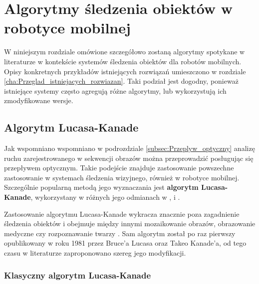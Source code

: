 \chapter{Algorytmy śledzenia obiektów w robotyce mobilnej}
\label{cha:Algorymty_sledzenia_obiektow_w_robotyce_mobilnej}

W niniejszym rozdziale omówione szczegółowo zostaną algorytmy spotykane w literaturze w kontekście systemów śledzenia obiektów dla robotów mobilnych. Opisy konkretnych przykładów istniejących rozwiązań umieszczono w rozdziale \ref{cha:Przeglad_istniejacych_rozwiazan}. Taki podział jest dogodny, ponieważ  istniejące systemy często agregują różne algorytmy, lub wykorzystują ich zmodyfikowane wersje.

\section{Algorytm Lucasa-Kanade}
\label{sec:Algorytm_Lucasa_Kanade}
Jak wspomniano wspomniano w podrozdziale \ref{subsec:Przeplyw_optyczny} analizę ruchu zarejestrowanego w sekwencji obrazów można przeprowadzić posługując się przepływem optycznym. Takie podejście znajduje zastosowanie powszechne zastosowanie w systemach śledzenia wizyjnego, również w robotyce mobilnej. Szczególnie popularną metodą jego wyznaczania jest \textbf{algorytm Lucasa-Kanade}, wykorzystany w różnych jego odmianach w \cite{Liem2008}, \cite{Markovic2014} i \cite{Olivares-Mendez2009}.

Zastosowanie algorytmu Lucasa-Kanade wykracza znacznie poza zagadnienie śledzenia obiektów i obejmuje między innymi mozaikowanie obrazów, obrazowanie medyczne czy rozpoznawanie twarzy \cite{Baker2004}. Sam algorytm został po raz pierwszy opublikowany w roku 1981 przez Bruce'a Lucasa oraz Takeo Kanade'a, od tego czasu w literaturze zaproponowano szereg jego modyfikacji.

\subsection{Klasyczny algorytm Lucasa-Kanade}
\label{subsec:Klasyczny_algorytm_Lucasa_Kanade}

